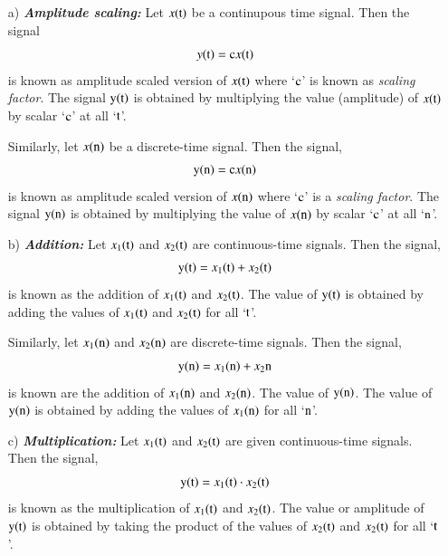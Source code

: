 \begin{itemize}
\item[{\rm a)}]{\it \bfseries Amplitude scaling:} Let $x(\textrm{t})$ be a continupous time signal. Then the signal
\begin{equation}
y({\textrm{t}}) = {\textrm{c}}  x(\textrm{t})\label{chap1-eq-1.26}
\end{equation}
is known as amplitude scaled version of $x ({\textrm{t}})$ where `${\textrm{c}}$' is known as \textit{scaling factor}. The signal $\textrm{y} (\textrm{t})$ is obtained by multiplying the value (amplitude) of $x (\textrm{t})$  by scalar `$\textrm{c}$' at all `$\textrm{t}$'.

Similarly, let $x (\textrm{n})$ be a discrete-time signal. Then the signal,
\begin{equation}
{\textrm{y}} ({\textrm{n}}) = {\textrm{c}} x {(\textrm{n})}\label{chap1-eq-1.27}  
\end{equation}
is known as amplitude scaled version of $x (\textrm{n})$ where `$\textrm{c}$' is a \textit{scaling factor}. The signal $\textrm{y}(\textrm{n})$ is obtained by multiplying the value of $x (\textrm{n})$ by scalar `$\textrm{c}$' at all `$\textrm{n}$'.

\item [{\rm b)}] {\it \bfseries Addition:} Let $x_{1}(\textrm{t})$ and $x_{2}(\textrm{t})$ are continuous-time signals. Then the signal,
\begin{equation}
{\textrm{y}}{(\textrm{t})} = x_{1}{(\textrm{t})} + x_{2}{(\textrm{t})}\label{chap1-eq-1.28}
\end{equation}
is known as the addition of $x_{1}{(\textrm{t})}$ and $x_{2}{(\textrm{t})}$. The value of ${\textrm{y}} {(\textrm{t})}$ is obtained by adding the values of $x_{1}{(\textrm{t})}$ and $x_{2}{(\textrm{t})}$ for all `${\textrm{t}}$'.

Similarly, let $x_{1}{(\textrm{n})}$ and $x_{2}{\rm(n)}$ are discrete-time signals. Then the signal,
\begin{equation}
{\textrm{y}}{(\textrm{n})} = x_{1} {(\textrm{n})} + x_{2}{\textrm{n}}\label{chap1-eq-1.29}
\end{equation}
is known are the addition of $x_{1}{\rm(n)}$ and $x_{2}{\rm(n)}$. The value of ${\textrm{y}}{(\textrm{n})}$. The value of ${\textrm{y}}{(\textrm{n})}$ is obtained by adding the values of $x_{1}{(\textrm{n})}$ for all `${\textrm{n}}$'.

\item[{\rm c)}]{\it \bfseries Multiplication:} Let $x_{1}{(\textrm{t})}$ and $x_{2}{(\textrm{t})}$ are given continuous-time signals. Then the signal,
\begin{equation}
{\textrm{y}}{(\textrm{t})} = x_{1}{(\textrm{t})} \cdot x_{2}{(\textrm{t})}\label{chap1-eq-1.30}
\end{equation}
is known as the multiplication of $x_{1}{(\textrm{t})}$ and $x_{2}{(\textrm{t})}$. The value or amplitude of $\textrm{y}(\textrm{t})$ is obtained by taking the product of the values of $x_{2}(\textrm{t})$ and $x_{2}(\textrm{t})$ for all `$\textrm{t}$'.


\end{itemize}

